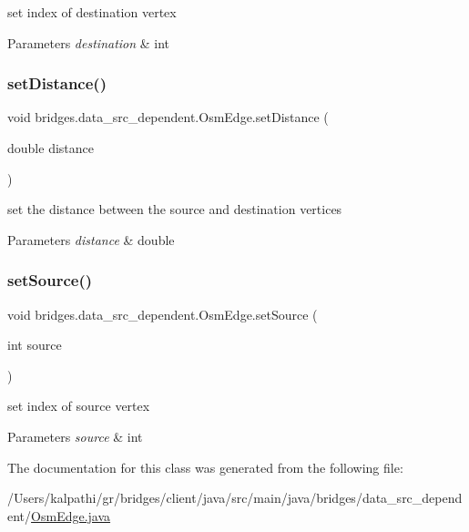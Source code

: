 set index of destination vertex 
\begin{DoxyParams}{Parameters}
{\em destination} & int \\
\hline
\end{DoxyParams}
\mbox{\label{classbridges_1_1data__src__dependent_1_1_osm_edge_afe9d2fa452c89d08d7c1a23ff3302c62}} 
\subsubsection{\texorpdfstring{set\+Distance()}{setDistance()}}
{\footnotesize\ttfamily void bridges.\+data\+\_\+src\+\_\+dependent.\+Osm\+Edge.\+set\+Distance (\begin{DoxyParamCaption}\item[{double}]{distance }\end{DoxyParamCaption})}

set the distance between the source and destination vertices 
\begin{DoxyParams}{Parameters}
{\em distance} & double \\
\hline
\end{DoxyParams}
\mbox{\label{classbridges_1_1data__src__dependent_1_1_osm_edge_aa61fb02ce746b89c26c71cd2f20053e7}} 
\subsubsection{\texorpdfstring{set\+Source()}{setSource()}}
{\footnotesize\ttfamily void bridges.\+data\+\_\+src\+\_\+dependent.\+Osm\+Edge.\+set\+Source (\begin{DoxyParamCaption}\item[{int}]{source }\end{DoxyParamCaption})}

set index of source vertex 
\begin{DoxyParams}{Parameters}
{\em source} & int \\
\hline
\end{DoxyParams}


The documentation for this class was generated from the following file\+:\begin{DoxyCompactItemize}
\item 
/\+Users/kalpathi/gr/bridges/client/java/src/main/java/bridges/data\+\_\+src\+\_\+dependent/\mbox{\hyperlink{_osm_edge_8java}{Osm\+Edge.\+java}}\end{DoxyCompactItemize}
